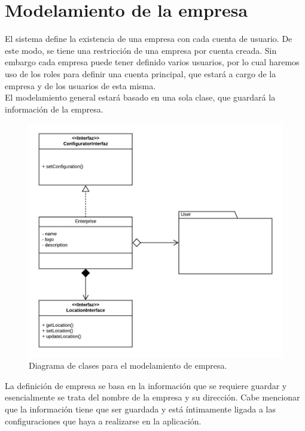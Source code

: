 \section{Modelamiento de la empresa}

El sistema define la existencia de una empresa con cada cuenta de usuario. De este modo, se tiene una restricción de una empresa por cuenta creada. Sin embargo cada empresa puede tener definido varios usuarios, por lo cual haremos uso de los roles para definir una cuenta principal, que estará a cargo de la empresa y de los usuarios de esta misma.\\

El modelamiento general estará basado en una sola clase, que guardará la información de la empresa.\\

\begin{figure}
  \centering
    \includegraphics[scale=0.9]{./Capitulo3/figs/ADDStock-enterprise.jpeg}
  \caption{Diagrama de clases para el modelamiento de empresa.}
  \label{enterprise}
\end{figure}

La definición de empresa se basa en la información que se requiere guardar y esencialmente se trata del nombre de la empresa y su dirección. Cabe mencionar que la información tiene que ser guardada y está íntimamente ligada a las configuraciones que haya a realizarse en la aplicación.\\

